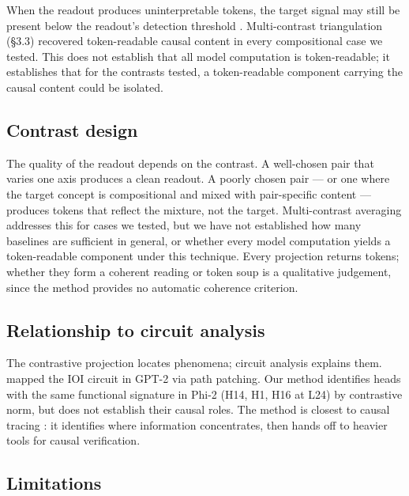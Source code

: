 \documentclass[11pt]{article}
\begin{document}
When the readout produces uninterpretable tokens, the target signal may
still be present below the readout's detection threshold
\citep{tuomi2026visibility}. Multi-contrast triangulation (\S3.3)
recovered token-readable causal content in every compositional case we
tested. This does not establish that all model computation is
token-readable; it establishes that for the contrasts tested, a
token-readable component carrying the causal content could be isolated.

\subsection{Contrast design}

The quality of the readout depends on the contrast. A well-chosen pair
that varies one axis produces a clean readout. A poorly chosen pair --- or
one where the target concept is compositional and mixed with
pair-specific content --- produces tokens that reflect the mixture,
not the target. Multi-contrast averaging addresses this for cases we tested,
but we have not established how many baselines are sufficient in general,
or whether every model computation yields a token-readable component
under this technique. Every projection returns tokens; whether they
form a coherent reading or token soup is a qualitative judgement, since
the method provides no automatic coherence criterion.

\subsection{Relationship to circuit analysis}

The contrastive projection locates phenomena; circuit analysis explains
them.~\citet{wang2023} mapped the IOI circuit in GPT-2 via path
patching. Our method identifies heads with the same functional signature
in Phi-2 (H14, H1, H16 at L24) by contrastive norm, but does not
establish their causal roles. The method is closest to causal tracing
\citep{meng2022}: it identifies where information concentrates, then
hands off to heavier tools for causal verification.

\subsection{Limitations}
\end{document}

